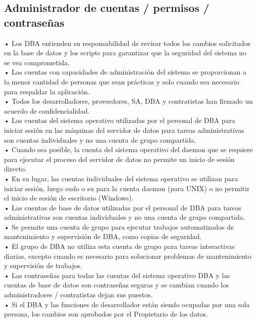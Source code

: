 \subsection{Administrador de cuentas / permisos / contraseñas}
• Los DBA entienden su responsabilidad de revisar todos los cambios solicitados en la base de datos y los scripts para garantizar que la seguridad del sistema no se vea comprometida.\\
• Las cuentas con capacidades de administración del sistema se proporcionan a la menor cantidad de personas que sean prácticas y solo cuando sea necesario para respaldar la aplicación.\\
• Todos los desarrolladores, proveedores, SA, DBA y contratistas han firmado un acuerdo de confidencialidad.\\
• Las cuentas del sistema operativo utilizadas por el personal de DBA para iniciar sesión en las máquinas del servidor de datos para tareas administrativas son cuentas individuales y no una cuenta de grupo compartida.\\
• Cuando sea posible, la cuenta del sistema operativo del daemon que se requiere para ejecutar el proceso del servidor de datos no permite un inicio de sesión directo.\\
• En su lugar, las cuentas individuales del sistema operativo se utilizan para iniciar sesión, luego sudo o su para la cuenta daemon (para UNIX) o no permitir el inicio de sesión de escritorio (Windows).\\
• Las cuentas de base de datos utilizadas por el personal de DBA para tareas administrativas son cuentas individuales y no una cuenta de grupo compartida.\\
• Se permite una cuenta de grupo para ejecutar trabajos automatizados de mantenimiento y supervisión de DBA, como copias de seguridad.\\
• El grupo de DBA no utiliza esta cuenta de grupo para tareas interactivas diarias, excepto cuando es necesario para solucionar problemas de mantenimiento y supervisión de trabajos.\\
• Las contraseñas para todas las cuentas del sistema operativo DBA y las cuentas de base de datos son contraseñas seguras y se cambian cuando los administradores / contratistas dejan sus puestos.\\
• Si el DBA y las funciones de desarrollador están siendo ocupadas por una sola persona, los cambios son aprobados por el Propietario de los datos.

